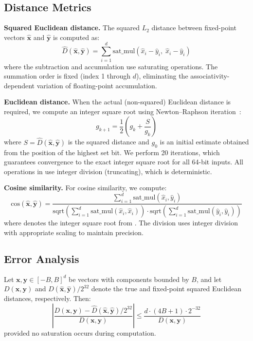 \documentclass[10pt,journal,compsoc]{IEEEtran}
\begin{document}
\subsection{Distance Metrics}

\textbf{Squared Euclidean distance.} The squared $L_2$ distance between fixed-point vectors $\hat{\mathbf{x}}$ and $\hat{\mathbf{y}}$ is computed as:
\begin{equation}
  \label{eq:fp_l2}
  \hat{D}(\hat{\mathbf{x}}, \hat{\mathbf{y}}) = \sum_{i=1}^{d} \text{sat\_mul}(\hat{x}_i - \hat{y}_i,\; \hat{x}_i - \hat{y}_i)
\end{equation}
where the subtraction and accumulation use saturating operations. The summation order is fixed (index 1 through $d$), eliminating the associativity-dependent variation of floating-point accumulation.

\textbf{Euclidean distance.} When the actual (non-squared) Euclidean distance is required, we compute an integer square root using Newton--Raphson iteration~\cite{schoenmakers2023fixedpoint}:
\begin{equation}
  \label{eq:newton}
  g_{k+1} = \frac{1}{2}\left(g_k + \frac{S}{g_k}\right)
\end{equation}
where $S = \hat{D}(\hat{\mathbf{x}}, \hat{\mathbf{y}})$ is the squared distance and $g_0$ is an initial estimate obtained from the position of the highest set bit. We perform 20 iterations, which guarantees convergence to the exact integer square root for all 64-bit inputs. All operations in  use integer division (truncating), which is deterministic.

\textbf{Cosine similarity.} For cosine similarity, we compute:
\begin{equation}
  \text{cos}(\hat{\mathbf{x}}, \hat{\mathbf{y}}) = \frac{\sum_{i=1}^{d} \text{sat\_mul}(\hat{x}_i, \hat{y}_i)}{\text{sqrt}\!\left(\sum_{i=1}^{d} \text{sat\_mul}(\hat{x}_i, \hat{x}_i)\right) \cdot \text{sqrt}\!\left(\sum_{i=1}^{d} \text{sat\_mul}(\hat{y}_i, \hat{y}_i)\right)}
\end{equation}
where  denotes the integer square root from . The division uses integer division with appropriate scaling to maintain precision.

\subsection{Error Analysis}

\begin{theorem}
\label{thm:error}
Let $\mathbf{x}, \mathbf{y} \in [-B, B]^d$ be vectors with components bounded by $B$, and let $D(\mathbf{x}, \mathbf{y})$ and $\hat{D}(\hat{\mathbf{x}}, \hat{\mathbf{y}})/2^{32}$ denote the true and fixed-point squared Euclidean distances, respectively. Then:
\begin{equation}
  \left|\frac{D(\mathbf{x}, \mathbf{y}) - \hat{D}(\hat{\mathbf{x}}, \hat{\mathbf{y}})/2^{32}}{D(\mathbf{x}, \mathbf{y})}\right| \leq \frac{d \cdot (4B + 1) \cdot 2^{-32}}{D(\mathbf{x}, \mathbf{y})}
\end{equation}
provided no saturation occurs during computation.
\end{theorem}
\end{document}
